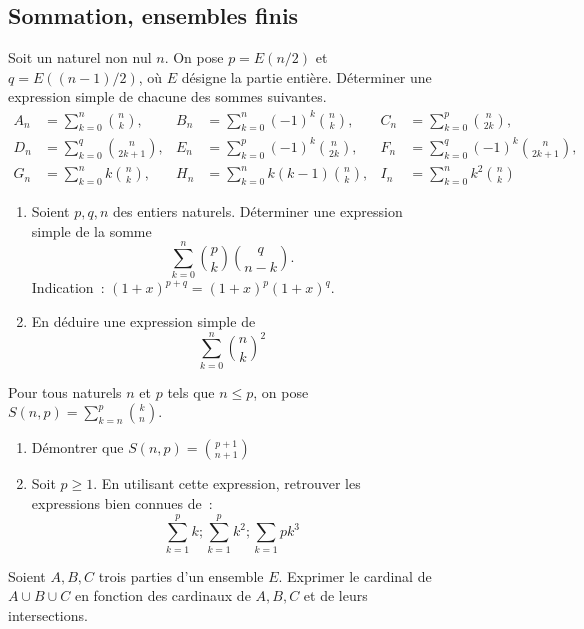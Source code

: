 \begin{figure}
\subsection{Sommation, ensembles finis}
\begin{exercice}
    Soit un naturel non nul \(n\). On pose \(p = E(n/2)\) et \(q = E((n-1)/2)\), où \(E\) désigne la partie entière. Déterminer une expression simple de chacune des sommes suivantes.
    \begin{align*}
        A_n &= \sum_{k=0}^n \binom{n}{k}, & B_n&=\sum_{k=0}^n (-1)^k\binom{n}{k}, & C_n&=\sum_{k=0}^p \binom{n}{2k}, \\
        D_n &= \sum_{k=0}^q \binom{n}{2k+1}, & E_n&=\sum_{k=0}^p (-1)^k\binom{n}{2k}, & F_n&=\sum_{k=0}^q (-1)^k\binom{n}{2k+1}, \\
        G_n &= \sum_{k=0}^n k\binom{n}{k}, & H_n&=\sum_{k=0}^n k(k-1)\binom{n}{k}, & I_n&=\sum_{k=0}^n k^2\binom{n}{k}
    \end{align*}
\end{exercice}
\begin{exercice}
    \begin{enumerate}
        \item Soient \(p, q, n\) des entiers naturels. Déterminer une expression simple de la somme \[\sum_{k=0}^n \binom{p}{k}\binom{q}{n-k}.\] Indication~: \((1+x)^{p+q} = (1+x)^p (1+x)^q\).
        \item En déduire une expression simple de \[\sum_{k=0}^n \binom{n}{k}^2\]
    \end{enumerate}
\end{exercice}
\begin{exercice}
    Pour tous naturels \(n\) et \(p\) tels que \(n \leqslant p\), on pose \(S(n,p) = \sum_{k=n}^p \binom{k}{n}\).
    \begin{enumerate}
        \item Démontrer que \(S(n,p) = \binom{p+1}{n+1}\)
        \item Soit \(p \geqslant 1\). En utilisant cette expression, retrouver les expressions bien connues de~:\[\sum_{k=1}^p k ; \sum_{k=1}^p k^2 ; \sum_{k=1}{p} k^3\]
    \end{enumerate}
\end{exercice}
\begin{exercice}
    Soient \(A, B, C\) trois parties d'un ensemble \(E\). Exprimer le cardinal de \(A \cup B \cup C\) en fonction des cardinaux de \(A, B, C\) et de leurs intersections.
\end{exercice}
\begin{exercice}

\end{exercice}
\end{figure}
